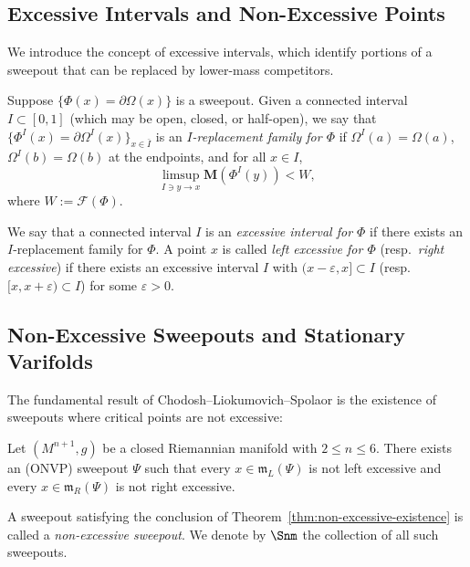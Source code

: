 \subsection{Excessive Intervals and Non-Excessive Points}

We introduce the concept of excessive intervals, which identify portions of a sweepout that can be replaced by lower-mass competitors.

\begin{definition}\label{def:excessive-interval}
Suppose $\{\Phi(x) = \partial\Omega(x)\}$ is a sweepout. Given a connected interval $I \subset [0,1]$
(which may be open, closed, or half-open), we say that $\{\Phi^I(x) = \partial\Omega^I(x)\}_{x\in \bar{I}}$
is an \emph{$I$-replacement family for $\Phi$} if
$\Omega^I(a) = \Omega(a)$, $\Omega^I(b) = \Omega(b)$ at the endpoints, and for all $x \in I$,
\[
\limsup_{I \ni y \to x} \mathbf{M}(\Phi^I(y)) < W,
\]
where $W := \mathcal{F}(\Phi)$.

We say that a connected interval $I$ is an \emph{excessive interval for $\Phi$} if there exists an $I$-replacement family
for $\Phi$. A point $x$ is called \emph{left excessive for $\Phi$} (resp.\ \emph{right excessive}) if there exists an excessive interval $I$ with
$(x-\varepsilon, x] \subset I$ (resp.\ $[x, x+\varepsilon) \subset I$) for some $\varepsilon > 0$.
\end{definition}

\subsection{Non-Excessive Sweepouts and Stationary Varifolds}\label{subsec:stationary-varifolds-non-excessive}

The fundamental result of Chodosh--Liokumovich--Spolaor is the existence of sweepouts where critical points are not excessive:

\begin{theorem}\label{thm:non-excessive-existence}
Let $(M^{n+1},g)$ be a closed Riemannian manifold with $2\leq n\leq 6$. There exists an (ONVP) sweepout $\Psi$ such that every $x\in \mathfrak{m}_L(\Psi)$ is not left excessive and every $x \in \mathfrak{m}_R(\Psi)$ is not right excessive.
\end{theorem}

A sweepout satisfying the conclusion of Theorem~\ref{thm:non-excessive-existence} is called a \emph{non-excessive sweepout}. We denote by $\Snm$ the collection of all such sweepouts.


